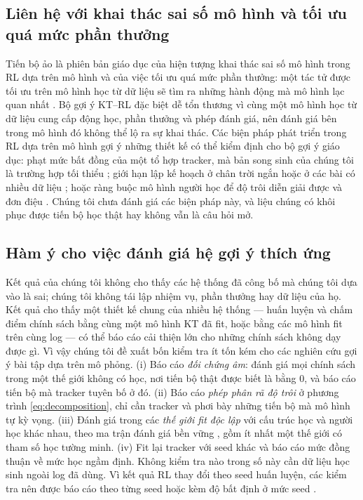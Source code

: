 \subsection{Liên hệ với khai thác sai số mô hình và tối ưu quá mức phần thưởng}

Tiến bộ ảo là phiên bản giáo dục của hiện tượng khai thác sai số mô hình trong RL dựa trên mô hình và của việc tối ưu quá mức phần thưởng: một tác tử được tối ưu trên mô hình học từ dữ liệu sẽ tìm ra những hành động mà mô hình lạc quan nhất \citep{kurutach2018metrpo,janner2019trust,gao2023scaling,skalse2022reward}. Bộ gợi ý KT--RL đặc biệt dễ tổn thương vì cùng một mô hình học từ dữ liệu cung cấp động học, phần thưởng và phép đánh giá, nên đánh giá bên trong mô hình đó không thể lộ ra sự khai thác. Các biện pháp phát triển trong RL dựa trên mô hình gợi ý những thiết kế có thể kiểm định cho bộ gợi ý giáo dục: phạt mức bất đồng của một tổ hợp tracker, mà bản song sinh của chúng tôi là trường hợp tối thiểu \citep{kurutach2018metrpo,yu2020mopo}; giới hạn lập kế hoạch ở chân trời ngắn hoặc ở các bài có nhiều dữ liệu \citep{janner2019trust}; hoặc ràng buộc mô hình người học để độ trôi diễn giải được và đơn điệu \citep{zhang2023cmkt}. Chúng tôi chưa đánh giá các biện pháp này, và liệu chúng có khôi phục được tiến bộ học thật hay không vẫn là câu hỏi mở.

\subsection{Hàm ý cho việc đánh giá hệ gợi ý thích ứng}

Kết quả của chúng tôi không cho thấy các hệ thống đã công bố mà chúng tôi dựa vào là sai; chúng tôi không tái lập nhiệm vụ, phần thưởng hay dữ liệu của họ. Kết quả cho thấy một thiết kế chung của nhiều hệ thống — huấn luyện và chấm điểm chính sách bằng cùng một mô hình KT đã fit, hoặc bằng các mô hình fit trên cùng log — có thể báo cáo cải thiện lớn cho những chính sách không dạy được gì. Vì vậy chúng tôi đề xuất bốn kiểm tra ít tốn kém cho các nghiên cứu gợi ý bài tập dựa trên mô phỏng. (i) Báo cáo \emph{đối chứng âm}: đánh giá mọi chính sách trong một thế giới không có học, nơi tiến bộ thật được biết là bằng 0, và báo cáo tiến bộ mà tracker tuyên bố ở đó. (ii) Báo cáo \emph{phép phân rã độ trôi} ở phương trình \eqref{eq:decomposition}, chỉ cần tracker và phơi bày những tiến bộ mà mô hình tự kỳ vọng. (iii) Đánh giá trong các \emph{thế giới fit độc lập} với cấu trúc học và người học khác nhau, theo ma trận đánh giá bền vững \citep{doroudi2017rem}, gồm ít nhất một thế giới có tham số học tường minh. (iv) Fit lại tracker với seed khác và báo cáo mức đồng thuận về mức học ngầm định. Không kiểm tra nào trong số này cần dữ liệu học sinh ngoài log đã dùng. Vì kết quả RL thay đổi theo seed huấn luyện, các kiểm tra nên được báo cáo theo từng seed hoặc kèm độ bất định ở mức seed \citep{henderson2018matters,agarwal2021precipice}.

